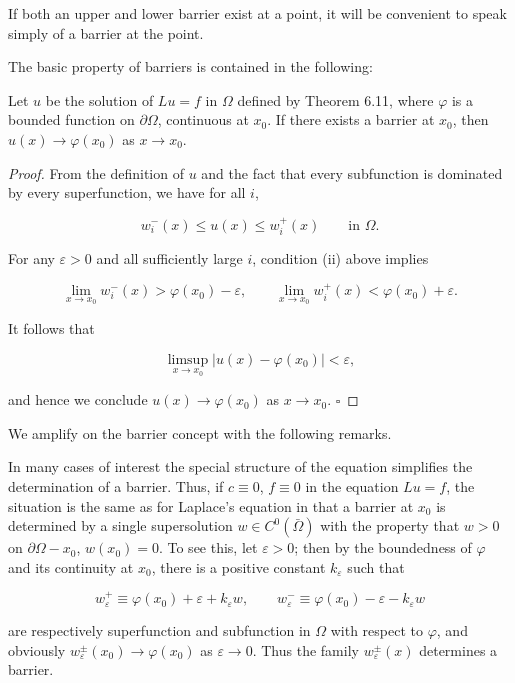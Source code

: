 If both an upper and lower barrier exist at a point, it will be convenient to speak simply of a barrier at the point.

The basic property of barriers is contained in the following:

\begin{lemma}[6.12]
Let $u$ be the solution of $Lu=f$ in $\Omega$ defined by Theorem 6.11, where $\varphi$ is a bounded function on $\partial\Omega$, continuous at $x_0$. If there exists a barrier at $x_0$, then $u(x)\to \varphi(x_0)$ as $x\to x_0$.
\end{lemma}

\begin{proof}
From the definition of $u$ and the fact that every subfunction is dominated by every superfunction, we have for all $i$,

\[
w_i^-(x)\le u(x)\le w_i^+(x) \qquad \text{in } \Omega.
\]

For any $\varepsilon>0$ and all sufficiently large $i$, condition (ii) above implies

\[
\lim_{x\to x_0} w_i^-(x)>\varphi(x_0)-\varepsilon, \qquad \lim_{x\to x_0} w_i^+(x)<\varphi(x_0)+\varepsilon.
\]

It follows that

\[
\limsup_{x\to x_0} |u(x)-\varphi(x_0)|<\varepsilon,
\]

and hence we conclude $u(x)\to \varphi(x_0)$ as $x\to x_0$. $\square$
\end{proof}

We amplify on the barrier concept with the following remarks.

\begin{remark}[1]
In many cases of interest the special structure of the equation simplifies the determination of a barrier. Thus, if $c\equiv 0$, $f\equiv 0$ in the equation $Lu=f$, the situation is the same as for Laplace's equation in that a barrier at $x_0$ is determined by a single supersolution $w\in C^0(\bar{\Omega})$ with the property that $w>0$ on $\partial\Omega-x_0$, $w(x_0)=0$. To see this, let $\varepsilon>0$; then by the boundedness of $\varphi$ and its continuity at $x_0$, there is a positive constant $k_\varepsilon$ such that
\end{remark}

\[
w_\varepsilon^+\equiv \varphi(x_0)+\varepsilon+k_\varepsilon w, \qquad w_\varepsilon^-\equiv \varphi(x_0)-\varepsilon-k_\varepsilon w
\]

are respectively superfunction and subfunction in $\Omega$ with respect to $\varphi$, and obviously $w_\varepsilon^\pm(x_0)\to \varphi(x_0)$ as $\varepsilon\to 0$. Thus the family $w_\varepsilon^\pm(x)$ determines a barrier.

